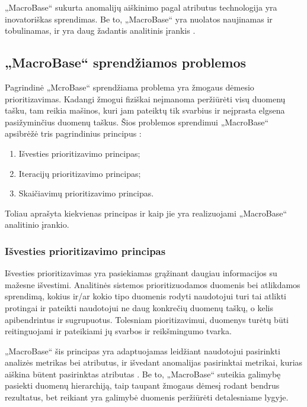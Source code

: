 \documentclass{VUMIFPSkursinis}
\begin{document}
„MacroBase“ sukurta anomalijų aiškinimo pagal atributus technologija yra inovatoriškas sprendimas. Be to, „MacroBase“ yra nuolatos naujinamas ir tobulinamas, ir yra daug žadantis analitinis įrankis \cite{macrobase_overview}.

\subsection{„MacroBase“ sprendžiamos problemos} \label{subsec:macrobase_problemos}
Pagrindinė „McroBase“ sprendžiama problema yra žmogaus dėmesio prioritizavimas. Kadangi žmogui fiziškai neįmanoma peržiūrėti visų duomenų tašku, tam reikia mašinos, kuri jam pateiktų tik svarbius ir neįprasta elgsena pasižyminčius duomenų taškus. Šios problemos sprendimui „MacroBase“ apsibrėžė tris pagrindinius principus \cite{prioritizing_attention}:

\begin{enumerate}
\item Išvesties prioritizavimo principas;
\item Iteracijų prioritizavimo principas;
\item Skaičiavimų prioritizavimo principas.
\end{enumerate} 

Toliau aprašyta kiekvienas principas ir kaip jie yra realizuojami „MacroBase“ analitinio įrankio.

\subsubsection{Išvesties prioritizavimo principas}
Išvesties prioritizavimas yra pasiekiamas grąžinant daugiau informacijos su mažesne išvestimi.  Analitinės sistemos prioritizuodamos duomenis bei atlikdamos sprendimą, kokius ir/ar kokio tipo duomenis rodyti naudotojui turi tai atlikti protingai ir pateikti naudotojui ne daug konkrečių duomenų taškų, o kelis apibendrintus ir sugrupuotus. Tolesniam pioritizavimui, duomenys turėtų būti reitinguojami ir pateikiami jų svarbos ir reikšmingumo tvarka.\par

„MacroBase“ šis principas yra adaptuojamas leidžiant naudotojui pasirinkti analizės metrikas bei atributus, ir išvedant anomalijas pasirinktai metrikai, kurias aiškina būtent pasirinktas atributas \cite{prioritizing_attention}. Be to, „MacroBase“ suteikia galimybę pasiekti duomenų hierarchiją, taip taupant žmogaus dėmesį rodant bendrus rezultatus, bet reikiant yra galimybė duomenis peržiūrėti detalesniame lygyje.
\end{document}
